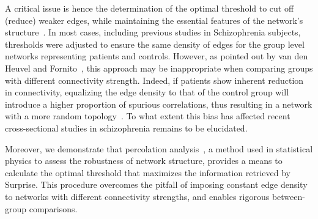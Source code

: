 A critical issue is hence the determination of the optimal threshold to cut off (reduce) weaker edges, while maintaining the essential features of the network's structure~\cite{alexander-bloch2010}.
In most cases, including previous studies in Schizophrenia subjects, thresholds were adjusted to ensure the same density of edges for the group level networks representing patients and controls.
However, as pointed out by van den Heuvel and Fornito~\cite{vandenheuvel2014}, this approach may be inappropriate when comparing groups with different connectivity strength.
Indeed, if patients show inherent reduction in connectivity, equalizing the edge density to that of the control group will introduce a higher proportion of spurious correlations, thus resulting in a network with a more random topology~\cite{fornito2012}. To what extent this bias has affected recent cross-sectional studies in schizophrenia remains to be elucidated.

Moreover, we demonstrate that percolation analysis~\cite{stauffer1994,gallos2012}, a method used in statistical physics to assess the robustness of network structure, provides a means to calculate the optimal threshold that maximizes the information retrieved by Surprise.
This procedure overcomes the pitfall of imposing constant edge density to networks with different connectivity strengths, and enables rigorous between-group comparisons.


